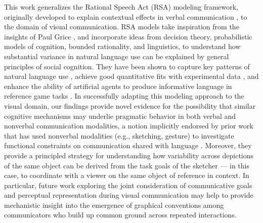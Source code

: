 \documentclass[9pt,twocolumn,twoside]{pnas-new}
\begin{document}
This work generalizes the Rational Speech Act (RSA) modeling framework, originally developed to explain contextual effects in verbal communication \cite{frank2012predicting,goodman2013knowledge,franke2016probabilistic,bergen2016pragmatic}, to the domain of visual communication.
RSA models take inspiration from the insights of Paul Grice \cite{grice1975syntax}, and incorporate ideas from decision theory, probabilistic models of cognition, bounded rationality, and linguistics, to understand how substantial variance in natural language use can be explained by general principles of social cognition. 
They have been shown to capture key patterns of natural language use \cite{goodman2013knowledge}, achieve good quantitative fits with experimental data \cite{kao2014formalizing}, and enhance the ability of artificial agents to produce informative language in reference game tasks \cite{monroe2017colors,Cohn-GordonGP18}.
In successfully adapting this modeling approach to the visual domain, our findings provide novel evidence for the possibility that similar cognitive mechanisms may underlie pragmatic behavior in both verbal and nonverbal communication modalities, a notion implicitly endorsed by prior work that has used nonverbal modalities (e.g., sketching, gesture) to investigate functional constraints on communication shared with language
\cite{goldin1977development,Garrod:2007wk,fay2010interactive,theisen2010systematicity,garrod2010can,Galantucci:2005uh,verhoef2014emergence}. %
Moreover, they provide a principled strategy for understanding how variability across depictions of the same object can be derived from the task goals of the sketcher --- in this case, to coordinate with a viewer on the same object of reference in context. 
In particular, future work exploring the joint consideration of communicative goals and perceptual representation during visual communication may help to provide mechanistic insight into the emergence of graphical conventions among communicators who build up common ground across repeated interactions. 

\end{document}
